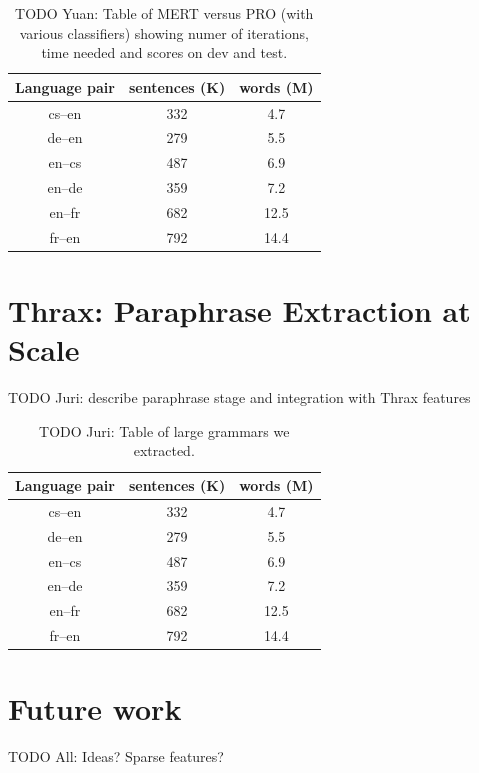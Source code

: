 \documentclass[11pt]{article}
\begin{document}
\begin{table}
\centering
\begin{tabular}{|c|c|c|}
Language pair & sentences (K) & words (M) \\
\hline\hline
cs--en & 332 & 4.7 \\
de--en & 279 & 5.5 \\
en--cs & 487 & 6.9 \\
en--de & 359 & 7.2 \\
en--fr & 682 & 12.5 \\
fr--en & 792 & 14.4 \\
\end{tabular}
\caption{TODO Yuan: Table of MERT versus PRO (with various
  classifiers) showing numer of iterations, time needed and scores on
  dev and test.}
\end{table}


\section{Thrax: Paraphrase Extraction at Scale}

TODO Juri: describe paraphrase stage and integration with Thrax
features

\begin{table}
\centering
\begin{tabular}{|c|c|c|}
Language pair & sentences (K) & words (M) \\
\hline\hline
cs--en & 332 & 4.7 \\
de--en & 279 & 5.5 \\
en--cs & 487 & 6.9 \\
en--de & 359 & 7.2 \\
en--fr & 682 & 12.5 \\
fr--en & 792 & 14.4 \\
\end{tabular}
\caption{TODO Juri: Table of large grammars we extracted.}
\end{table}

\section{Future work}

TODO All: Ideas? Sparse features?





\end{document}
